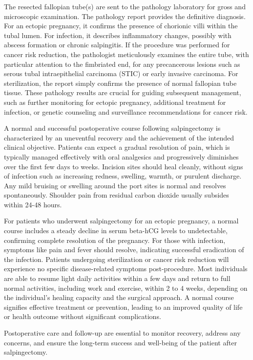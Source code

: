 The resected fallopian tube(s) are sent to the pathology laboratory for gross and microscopic examination. The pathology report provides the definitive diagnosis. For an ectopic pregnancy, it confirms the presence of chorionic villi within the tubal lumen. For infection, it describes inflammatory changes, possibly with abscess formation or chronic salpingitis. If the procedure was performed for cancer risk reduction, the pathologist meticulously examines the entire tube, with particular attention to the fimbriated end, for any precancerous lesions such as serous tubal intraepithelial carcinoma (STIC) or early invasive carcinoma. For sterilization, the report simply confirms the presence of normal fallopian tube tissue. These pathology results are crucial for guiding subsequent management, such as further monitoring for ectopic pregnancy, additional treatment for infection, or genetic counseling and surveillance recommendations for cancer risk.

A normal and successful postoperative course following salpingectomy is characterized by an uneventful recovery and the achievement of the intended clinical objective. Patients can expect a gradual resolution of pain, which is typically managed effectively with oral analgesics and progressively diminishes over the first few days to weeks. Incision sites should heal cleanly, without signs of infection such as increasing redness, swelling, warmth, or purulent discharge. Any mild bruising or swelling around the port sites is normal and resolves spontaneously. Shoulder pain from residual carbon dioxide usually subsides within 24-48 hours.

For patients who underwent salpingectomy for an ectopic pregnancy, a normal course includes a steady decline in serum beta-hCG levels to undetectable, confirming complete resolution of the pregnancy. For those with infection, symptoms like pain and fever should resolve, indicating successful eradication of the infection. Patients undergoing sterilization or cancer risk reduction will experience no specific disease-related symptoms post-procedure. Most individuals are able to resume light daily activities within a few days and return to full normal activities, including work and exercise, within 2 to 4 weeks, depending on the individual's healing capacity and the surgical approach. A normal course signifies effective treatment or prevention, leading to an improved quality of life or health outcome without significant complications.

Postoperative care and follow-up are essential to monitor recovery, address any concerns, and ensure the long-term success and well-being of the patient after salpingectomy.

